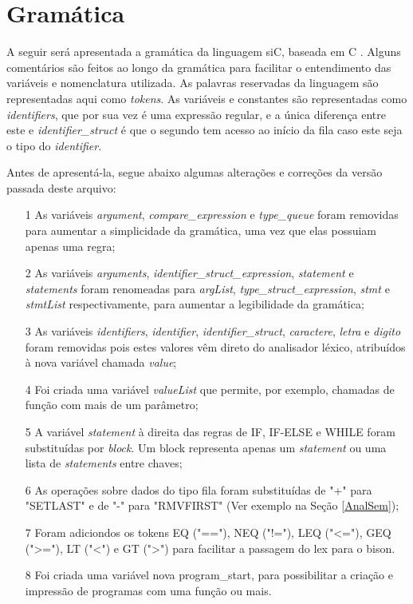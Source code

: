 \documentclass[12pt]{article}
\begin{document}
\section{Gramática}

\indent A seguir será apresentada a gramática da linguagem siC, baseada em C \cite{yacc}. Alguns comentários são feitos ao longo da gramática para facilitar o entendimento das variáveis e nomenclatura utilizada. As palavras reservadas da linguagem são representadas aqui como \textit{tokens}. As variáveis e constantes são representadas como \textit{identifiers}, que por sua vez é uma expressão regular, e a única diferença entre este e \textit{identifier\_struct} é que o segundo tem acesso ao início da fila caso este seja o tipo do \textit{identifier}. 

\indent Antes de apresentá-la, segue abaixo algumas alterações e correções da versão passada deste arquivo:

\begin{itemize}
	\item[1] As variáveis \textit{argument}, \textit{compare\_expression} e \textit{type\_queue} foram removidas para aumentar a simplicidade da gramática, uma vez que elas possuiam apenas uma regra;
	\item[2] As variáveis \textit{arguments}, \textit{identifier\_struct\_expression}, \textit{statement} e \textit{statements} foram renomeadas para \textit{argList}, \textit{type\_struct\_expression}, \textit{stmt} e \textit{stmtList} respectivamente, para aumentar a legibilidade da gramática;
	\item[3] As variáveis \textit{identifiers}, \textit{identifier}, \textit{identifier\_struct}, \textit{caractere}, \textit{letra} e \textit{digito} foram removidas pois estes valores vêm direto do analisador léxico, atribuídos à nova variável chamada \textit{value};
	\item[4] Foi criada uma variável \textit{valueList} que permite, por exemplo, chamadas de função com mais de um parâmetro;
	\item[5] A variável \textit{statement} à direita das regras de IF, IF-ELSE e WHILE foram substituídas por \textit{block}. Um block representa apenas um \textit{statement} ou uma lista de \textit{statements} entre chaves;
	\item[6] As operações sobre dados do tipo fila foram substituídas de "+" para "SETLAST" e de "-" para "RMVFIRST" (Ver exemplo na Seção \ref{AnalSem});
	\item[7] Foram adiciondos os tokens EQ ("=="), NEQ ("!="), LEQ ("<="), GEQ (">="), LT ("<") e GT (">") para facilitar a passagem do lex para o bison.
	\item[8] Foi criada uma variável nova program\_start, para possibilitar a criação e impressão de programas com uma função ou mais.
\end{itemize}
\end{document}
